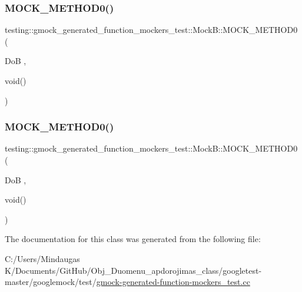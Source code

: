 \subsubsection{\texorpdfstring{MOCK\_METHOD0()}{MOCK\_METHOD0()}\hspace{0.1cm}{\footnotesize\ttfamily [2/3]}}
{\footnotesize\ttfamily testing\+::gmock\+\_\+generated\+\_\+function\+\_\+mockers\+\_\+test\+::\+Mock\+B\+::\+M\+O\+C\+K\+\_\+\+M\+E\+T\+H\+O\+D0 (\begin{DoxyParamCaption}\item[{DoB}]{,  }\item[{void()}]{ }\end{DoxyParamCaption})}

\mbox{\label{classtesting_1_1gmock__generated__function__mockers__test_1_1_mock_b_af0a5dcd462fc478e5e7a1ef503aafb05}} 
\subsubsection{\texorpdfstring{MOCK\_METHOD0()}{MOCK\_METHOD0()}\hspace{0.1cm}{\footnotesize\ttfamily [3/3]}}
{\footnotesize\ttfamily testing\+::gmock\+\_\+generated\+\_\+function\+\_\+mockers\+\_\+test\+::\+Mock\+B\+::\+M\+O\+C\+K\+\_\+\+M\+E\+T\+H\+O\+D0 (\begin{DoxyParamCaption}\item[{DoB}]{,  }\item[{void()}]{ }\end{DoxyParamCaption})}



The documentation for this class was generated from the following file\+:\begin{DoxyCompactItemize}
\item 
C\+:/\+Users/\+Mindaugas K/\+Documents/\+Git\+Hub/\+Obj\+\_\+\+Duomenu\+\_\+apdorojimas\+\_\+class/googletest-\/master/googlemock/test/\mbox{\hyperlink{googletest-master_2googlemock_2test_2gmock-generated-function-mockers__test_8cc}{gmock-\/generated-\/function-\/mockers\+\_\+test.\+cc}}\end{DoxyCompactItemize}
